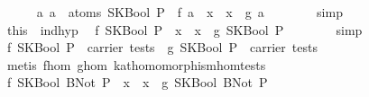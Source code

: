 \begin{isabellebody}
\ \ \ \ \isamarkupfalse%
\ {}{}a{}\ a\ {}\ atoms\ {}SKBool\ P{}\ {}\ f\ a\ {}\ x\ {}\ x\ {}\ g\ a{}\isanewline
\ \ \ \ \ \ \isamarkupfalse%
\ simp\isanewline
\ \ \ \ \isamarkupfalse%
\ this\ \ ind{}hyp\ \isamarkupfalse%
\ {}f\ {}SKBool\ P{}\ {}\ x\ {}\ x\ {}\ g\ {}SKBool\ P{}{}\isanewline
\ \ \ \ \ \ \isamarkupfalse%
\ simp\isanewline
\ \ \ \ \isamarkupfalse%
\ \isamarkupfalse%
\ {}f\ {}SKBool\ P{}\ {}\ carrier\ tests{}\ \ {}g\ {}SKBool\ P{}\ {}\ carrier\ tests{}\isanewline
\ \ \ \ \ \ \isamarkupfalse%
\ {}metis\ f{}hom\ g{}hom\ kat{}homomorphism{}hom{}tests{}{}\isanewline
\ \ \ \ \isamarkupfalse%
\ \isamarkupfalse%
\ {}f\ {}SKBool\ {}BNot\ P{}{}\ {}\ x\ {}\ x\ {}\ g\ {}SKBool\ {}BNot\ P{}{}{}\isanewline

\end{isabellebody}
